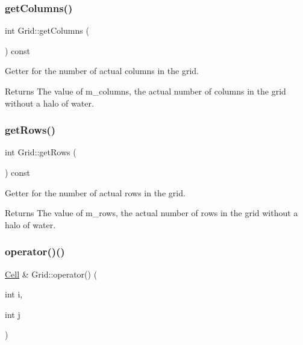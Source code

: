 \subsubsection{\texorpdfstring{get\+Columns()}{getColumns()}}
{\footnotesize\ttfamily int Grid\+::get\+Columns (\begin{DoxyParamCaption}{ }\end{DoxyParamCaption}) const}



Getter for the number of actual columns in the grid. 

\begin{DoxyReturn}{Returns}
The value of m\+\_\+columns, the actual number of columns in the grid without a halo of water. 
\end{DoxyReturn}
\mbox{\label{class_grid_aa9397afb775457f87b9096acf6082383}} 
\subsubsection{\texorpdfstring{get\+Rows()}{getRows()}}
{\footnotesize\ttfamily int Grid\+::get\+Rows (\begin{DoxyParamCaption}{ }\end{DoxyParamCaption}) const}



Getter for the number of actual rows in the grid. 

\begin{DoxyReturn}{Returns}
The value of m\+\_\+rows, the actual number of rows in the grid without a halo of water. 
\end{DoxyReturn}
\mbox{\label{class_grid_aed06be122077b3a0c1fe7c412c2535fc}} 
\subsubsection{\texorpdfstring{operator()()}{operator()()}\hspace{0.1cm}{\footnotesize\ttfamily [1/2]}}
{\footnotesize\ttfamily \hyperlink{class_cell}{Cell} \& Grid\+::operator() (\begin{DoxyParamCaption}\item[{int}]{i,  }\item[{int}]{j }\end{DoxyParamCaption})}

